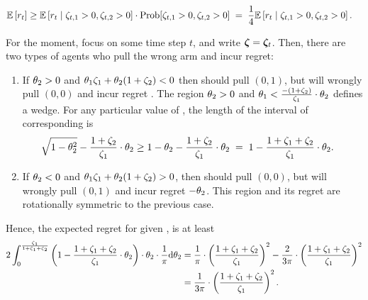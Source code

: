 \begin{align*}
\Expect{\Regret{t}} 
  & \geq \ExpectC{\Regret{t}}{\Noise[t]{1} > 0, \Noise[t]{2} > 0}
         \cdot \Prob{\Noise[t]{1} > 0, \Noise[t]{2} > 0}
  \; = \; \quarter \ExpectC{\Regret{t}}{\Noise[t]{1} > 0, \Noise[t]{2} > 0}.
\end{align*}

For the moment, focus on some time step $t$,
and write $\NoiseV = \NoiseV[t]$.
Then, there are two types of agents who pull the wrong arm and incur
regret:
\begin{enumerate}
\item If $\Ag{2} > 0$ and $\Ag{1} \Noise{1} + \Ag{2} (1+\Noise{2}) < 0$
then \Ag should pull $(0,1)$,
but will wrongly pull $(0,0)$ and incur regret .
The region
$\Ag{2} > 0$ and $\Ag{1} < \frac{-(1+\Noise{2})}{\Noise{1}} \cdot \Ag{2}$
defines a wedge.
For any particular value of ,
the length of the interval of corresponding  is
\begin{align*}
  \sqrt{1-\Ag{2}^2} - \frac{1+\Noise{2}}{\Noise{1}} \cdot \Ag{2}
  & \geq 1 - \Ag{2} - \frac{1+\Noise{2}}{\Noise{1}} \cdot \Ag{2}
  \; = \; 1 - \frac{1+\Noise{1}+\Noise{2}}{\Noise{1}} \cdot \Ag{2}.
\end{align*}

\item If $\Ag{2} < 0$ and $\Ag{1} \Noise{1} + \Ag{2} (1+\Noise{2}) > 0$,
then \Ag should pull $(0,0)$,
but will wrongly pull $(0,1)$ and incur regret $-\Ag{2}$.
This region and its regret are rotationally symmetric to the previous
case.
\end{enumerate}

Hence, the expected regret for given ,  is at least
\begin{align*}
  2 \int_0^{\frac{\Noise{1}}{1+\Noise{1}+\Noise{2}}}
  \left( 1 - \frac{1+\Noise{1}+\Noise{2}}{\Noise{1}} \cdot \Ag{2} \right)
  \cdot \Ag{2} \cdot \frac{1}{\pi} \dd \Ag{2}
& =
\frac{1}{\pi} \cdot \left(\frac{1+\Noise{1}+\Noise{2}}{\Noise{1}}\right)^2
- \frac{2}{3 \pi} \cdot \left(\frac{1+\Noise{1}+\Noise{2}}{\Noise{1}}\right)^2
\\ & =
\frac{1}{3 \pi} \cdot \left(\frac{1+\Noise{1}+\Noise{2}}{\Noise{1}}\right)^2.
\end{align*}

  
